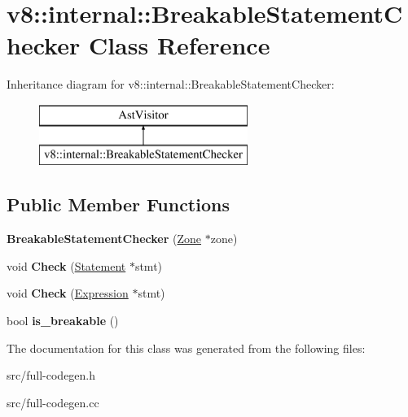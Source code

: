 \hypertarget{classv8_1_1internal_1_1_breakable_statement_checker}{}\section{v8\+:\+:internal\+:\+:Breakable\+Statement\+Checker Class Reference}
\label{classv8_1_1internal_1_1_breakable_statement_checker}
Inheritance diagram for v8\+:\+:internal\+:\+:Breakable\+Statement\+Checker\+:\begin{figure}[H]
\begin{center}
\leavevmode
\includegraphics[height=2.000000cm]{classv8_1_1internal_1_1_breakable_statement_checker}
\end{center}
\end{figure}
\subsection*{Public Member Functions}
\begin{DoxyCompactItemize}
\item 
\hypertarget{classv8_1_1internal_1_1_breakable_statement_checker_ac2379eac72f141623e516bfeb4c4a4fa}{}{\bfseries Breakable\+Statement\+Checker} (\hyperlink{classv8_1_1internal_1_1_zone}{Zone} $\ast$zone)\label{classv8_1_1internal_1_1_breakable_statement_checker_ac2379eac72f141623e516bfeb4c4a4fa}

\item 
\hypertarget{classv8_1_1internal_1_1_breakable_statement_checker_a99db34beb5528b3a608b20f946edb01c}{}void {\bfseries Check} (\hyperlink{classv8_1_1internal_1_1_statement}{Statement} $\ast$stmt)\label{classv8_1_1internal_1_1_breakable_statement_checker_a99db34beb5528b3a608b20f946edb01c}

\item 
\hypertarget{classv8_1_1internal_1_1_breakable_statement_checker_a47615f87cfef7a783545cfff0afc1441}{}void {\bfseries Check} (\hyperlink{classv8_1_1internal_1_1_expression}{Expression} $\ast$stmt)\label{classv8_1_1internal_1_1_breakable_statement_checker_a47615f87cfef7a783545cfff0afc1441}

\item 
\hypertarget{classv8_1_1internal_1_1_breakable_statement_checker_ae074a6c37f1eaae39fa4dff7fa99511a}{}bool {\bfseries is\+\_\+breakable} ()\label{classv8_1_1internal_1_1_breakable_statement_checker_ae074a6c37f1eaae39fa4dff7fa99511a}

\end{DoxyCompactItemize}


The documentation for this class was generated from the following files\+:\begin{DoxyCompactItemize}
\item 
src/full-\/codegen.\+h\item 
src/full-\/codegen.\+cc\end{DoxyCompactItemize}
